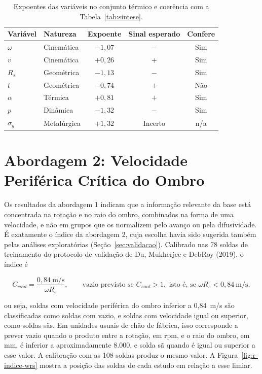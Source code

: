 \documentclass[12pt,openany]{report}
\begin{document}
\begin{table}[htbp]
\centering
\caption{Expoentes das variáveis no conjunto térmico e coerência com a Tabela~\ref{tab:sintese}.}
\label{tab:expoentes_1b}
\small
\begin{tabular}{llccc}
\toprule
\textbf{Variável} & \textbf{Natureza} & \textbf{Expoente} & \textbf{Sinal esperado} & \textbf{Confere} \\ \midrule
$\omega$ & Cinemática & $-1{,}07$ & $-$ & Sim \\
$v$ & Cinemática & $+0{,}26$ & $+$ & Sim \\
$R_s$ & Geométrica & $-1{,}13$ & $-$ & Sim \\
$t$ & Geométrica & $-0{,}74$ & $+$ & Não \\
$\alpha$ & Térmica & $+0{,}81$ & $+$ & Sim \\
$p$ & Dinâmica & $-1{,}32$ & $-$ & Sim \\
$\sigma_y$ & Metalúrgica & $+1{,}32$ & Incerto & n/a \\ \bottomrule
\end{tabular}
\end{table}

\section{Abordagem 2: Velocidade Periférica Crítica do Ombro}
\label{sec:res_abordagem2}

Os resultados da abordagem 1 indicam que a informação relevante da base está concentrada na rotação e no raio do ombro, combinados na forma de uma velocidade, e não em grupos que os normalizem pelo avanço ou pela difusividade. É exatamente o índice da abordagem 2, cuja escolha havia sido sugerida também pelas análises exploratórias (Seção~\ref{sec:validacao}). Calibrado nas 78 soldas de treinamento do protocolo de validação de Du, Mukherjee e DebRoy (2019), o índice é

\begin{equation}
C_{void} = \frac{0{,}84~\text{m/s}}{\omega R_s}, \qquad \text{vazio previsto se } C_{void} > 1, \text{ isto é, se } \omega R_s < 0{,}84~\text{m/s},
\label{eq:cvoid_a_final}
\end{equation}

\noindent ou seja, soldas com velocidade periférica do ombro inferior a 0,84~m/s são classificadas como soldas com vazio, e soldas com velocidade igual ou superior, como soldas sãs. Em unidades usuais de chão de fábrica, isso corresponde a prever vazio quando o produto entre a rotação, em rpm, e o raio do ombro, em mm, é inferior a aproximadamente 8.000, e solda sã quando é igual ou superior a esse valor. A calibração com as 108 soldas produz o mesmo valor. A Figura~\ref{fig:r-indice-wrs} mostra a posição das soldas de cada estudo em relação a esse limiar.
\end{document}
